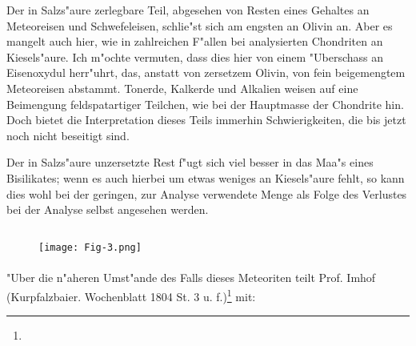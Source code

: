 \documentclass[a4paper, 11pt, oneside]{article}
\begin{document}
Der in Salzs"aure zerlegbare Teil, abgesehen von Resten eines Gehaltes an Meteoreisen und Schwefeleisen, schlie"st sich am engsten an Olivin an. Aber es mangelt auch hier, wie in zahlreichen F"allen bei analysierten Chondriten an Kiesels"aure. Ich m"ochte vermuten, dass dies hier von einem "Uberschass an Eisenoxydul herr"uhrt, das, anstatt von zersetzem Olivin, von fein beigemengtem Meteoreisen abstammt. Tonerde, Kalkerde und Alkalien weisen auf eine Beimengung feldspatartiger Teilchen, wie bei der Hauptmasse der Chondrite hin. Doch bietet die Interpretation dieses Teils immerhin Schwierigkeiten, die bis jetzt noch nicht beseitigt sind.

Der in Salzs"aure unzersetzte Rest f"ugt sich viel besser in das Maa"s eines Bisilikates; wenn es auch hierbei um etwas weniges an Kiesels"aure fehlt, so kann dies wohl bei der geringen, zur Analyse verwendete Menge als Folge des Verlustes bei der Analyse selbst angesehen werden.
\clearpage
\subsection{}
\begin{figure}[h]
\centering
\texttt{[image: Fig-3.png]}
\caption{}
\end{figure}
\paragraph{}
"Uber die n"aheren Umst"ande des Falls dieses Meteoriten teilt Prof. Imhof (Kurpfalzbaier. Wochenblatt 1804 St. 3 u. f.)\footnote{} mit:
\end{document}

